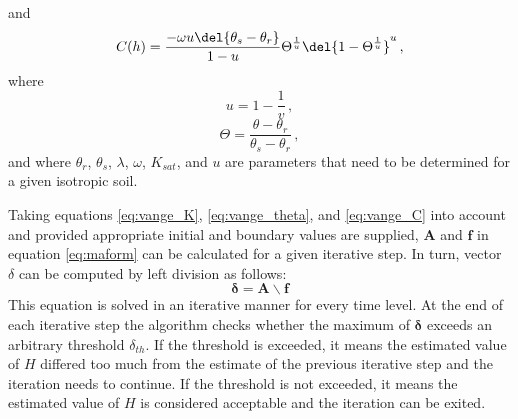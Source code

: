 and
\begin{equation}
  \label{eq:vange_C}
  C(h) = \frac{-\omega u \del{ \theta_s - \theta_r }}{1 - u} \Theta^{\frac{1}{u}} \del{ 1 - \Theta^{\frac{1}{u}} }^u \, ,
\end{equation}
where
\begin{equation*}
  u = 1 - \frac{1}{v} \, ,
\end{equation*}
\begin{equation*}
  \Theta = \frac{\theta - \theta_r}{\theta_s - \theta_r} \, ,
\end{equation*}
and where $\theta_r$, $\theta_s$, $\lambda$, $\omega$, $K_{sat}$, and $u$ are parameters that need to be determined for a given isotropic soil.

Taking equations \eqref{eq:vange_K}, \eqref{eq:vange_theta}, and \eqref{eq:vange_C} into account and provided appropriate initial and boundary values are supplied, $\mathbf{A}$ and $\mathbf{f}$ in equation \eqref{eq:maform} can be calculated for a given iterative step.  In turn, vector $\delta$ can be computed by left division as follows:
\begin{equation}
  \label{eq:maform_ledi}
  \boldsymbol{\delta} = \mathbf{A \backslash f}
\end{equation}
This equation is solved in an iterative manner for every time level.  At the end of each iterative step the algorithm checks whether the maximum of $\boldsymbol{\delta}$ exceeds an arbitrary threshold $\delta_{th}$.
If the threshold is exceeded, it means the estimated value of $H$ differed too much from the estimate of the previous iterative step and the iteration needs to continue.
If the threshold is not exceeded, it means the estimated value of $H$ is considered acceptable and the iteration can be exited.

